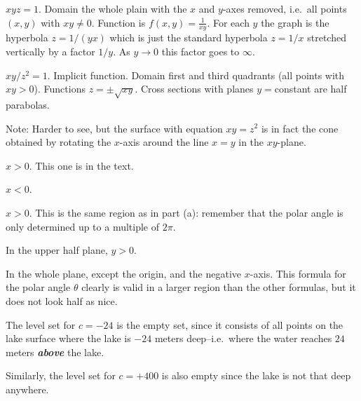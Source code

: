 \item[{\bfseries(III5.7f)}]

$xyz=1$.
Domain the whole plain with the $x$ and $y$-axes removed, i.e.\ all
points $(x, y)$ with $xy\ne0$.
Function is $f(x, y) = \frac{1} {xy}$.
For each $y$ the graph is the hyperbola $z=1/(yx)$ which is just the
standard hyperbola $z=1/x$ stretched vertically by a factor $1/y$.
As $y\to 0$ this factor goes to $\infty$.
\bigskip

\item[{\bfseries(III5.7g)}]

$xy/z^2=1$.
Implicit function.
Domain first and third quadrants (all points with $xy>0$).
Functions $z= \pm \sqrt{xy}$.
Cross sections with planes $y=$constant are half parabolas.

Note: Harder to see, but the surface with equation $xy=z^2$ is in fact
the cone obtained by rotating the $x$-axis around the line
$x=y$ in the $xy$-plane.
\bigskip

\item[{\bfseries(III5.8a)}]

$x>0$.  This one is in the text.
\bigskip

\item[{\bfseries(III5.8b)}]

$x<0$.
\bigskip

\item[{\bfseries(III5.8c)}]

$x>0$.  This is the same region as in part (a):  remember that the polar angle is
only determined up to a multiple of $2\pi$.
\bigskip

\item[{\bfseries(III5.8d)}]

In the upper half plane, $y>0$.
\bigskip

\item[{\bfseries(III5.8e)}]

In the whole plane, except the origin, and the negative $x$-axis.  This formula for
the polar angle $\theta$ clearly is valid in a larger region than the other formulas,
but it does not look half as nice.
\bigskip

\item[{\bfseries(III5.9)}]

The level set for $c=-24$ is the empty set, since it consists of all points on
the lake surface where the lake is $-24$ meters deep--i.e.~where the water
reaches $24$meters {\bfseries\itshape above} the lake.

Similarly, the level set for $c=+400$ is also empty since the lake is not that
deep anywhere.

